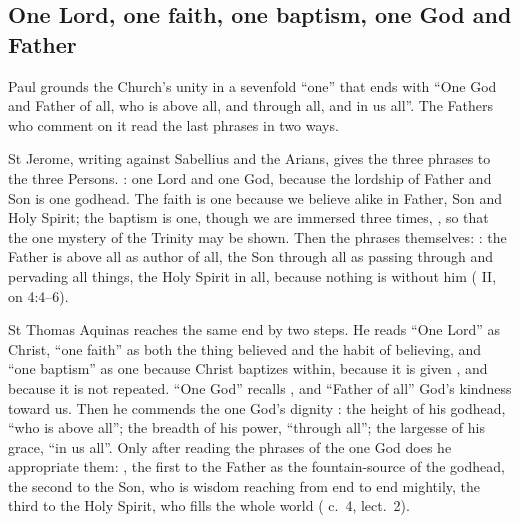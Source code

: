 \subsection{One Lord, one faith, one baptism, one God and Father}

Paul grounds the Church's unity in a sevenfold ``one'' that ends with ``One
God and Father of all, who is above all, and through all, and in us all''.
The Fathers who comment on it read the last phrases in two ways.

St Jerome, writing against Sabellius and the Arians, gives the three phrases
to the three Persons. : one Lord and one God, because the
lordship of Father and Son is one godhead. The faith is one because we
believe alike in Father, Son and Holy Spirit; the baptism is one, though we are
immersed three times, , so that
the one mystery of the Trinity may be shown. Then the phrases themselves:
: the Father is above all as author of all,
the Son through all as passing through and pervading all things, the Holy
Spirit in all, because nothing is without him ( II, on 4:4--6).

St Thomas Aquinas reaches the same end by two steps. He reads ``One Lord'' as
Christ, ``one faith'' as both the thing believed and the habit of believing,
and ``one baptism'' as one because Christ baptizes within, because it is
given , and because it is not
repeated. ``One God'' recalls , and
``Father of all'' God's kindness toward us. Then he commends the one God's
dignity : the height of his godhead, ``who is above all''; the
breadth of his power, ``through all''; the largesse of his grace, ``in us
all''. Only after reading the phrases of the one God does he appropriate them:
,
the first to the Father as the fountain-source of the godhead, the second to
the Son, who is wisdom reaching from end to end mightily, the third to the
Holy Spirit, who fills the whole world ( c.~4,
lect.~2).

